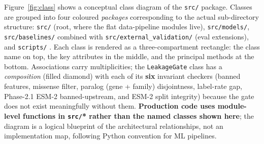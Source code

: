 \documentclass[11pt,a4paper,oneside]{report}
\begin{document}
Figure~\ref{fig:class} shows a conceptual class diagram of
the \texttt{src/} package. Classes are grouped into four
coloured \emph{packages} corresponding to the actual
sub-directory structure: \texttt{src/} (root, where the
flat data-pipeline modules live), \texttt{src/models/},
\texttt{src/baselines/} combined with
\texttt{src/external\_validation/} (eval extensions), and
\texttt{scripts/} \citep{martin2017cleanarch}. Each class
is rendered as a three-compartment rectangle: the class
name on top, the key attributes in the middle, and the
principal methods at the bottom. Associations carry
multiplicities; the \texttt{LeakageGate} class has a
\emph{composition} (filled diamond) with each of its
\textbf{six} invariant checkers (banned features, missense
filter, paralog (gene + family) disjointness, label-rate
gap, Phase-2.1 ESM-2 banned-upstream, and ESM-2 split
integrity) because the gate does not exist meaningfully
without them. \textbf{Production code uses module-level
functions in \texttt{src/}* rather than the named classes
shown here}; the diagram is a logical blueprint of the
architectural relationships, not an implementation map,
following Python convention for ML pipelines.
\end{document}
